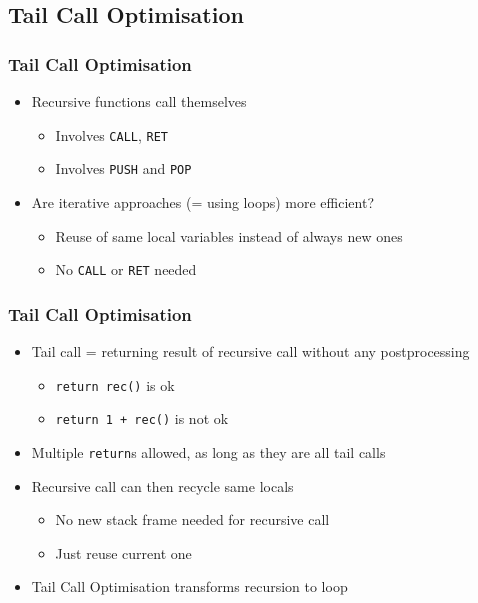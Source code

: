 \subsection{Tail Call Optimisation}

\frame{\tableofcontents[currentsubsection]}

\begin{frame}
  \frametitle{Tail Call Optimisation}
  \begin{itemize}
    \item Recursive functions call themselves
          \begin{itemize}
            \item Involves \texttt{CALL}, \texttt{RET}
            \item Involves \texttt{PUSH} and \texttt{POP}
          \end{itemize}
    \item Are iterative approaches (= using loops) more efficient?
          \begin{itemize}
            \item Reuse of same local variables instead of always new ones
            \item No \texttt{CALL} or \texttt{RET} needed
          \end{itemize}
  \end{itemize}
\end{frame}

\begin{frame}
  \frametitle{Tail Call Optimisation}
  \begin{itemize}
    \item Tail call = returning result of recursive call without any postprocessing
          \begin{itemize}
            \item \texttt{return rec()} is ok
            \item \texttt{return 1 + rec()} is not ok
          \end{itemize}
    \item Multiple \texttt{return}s allowed, as long as they are all tail calls
    \item Recursive call can then recycle same locals
          \begin{itemize}
            \item No new stack frame needed for recursive call
            \item Just reuse current one
          \end{itemize}
    \item Tail Call Optimisation transforms recursion to loop
  \end{itemize}
\end{frame}

